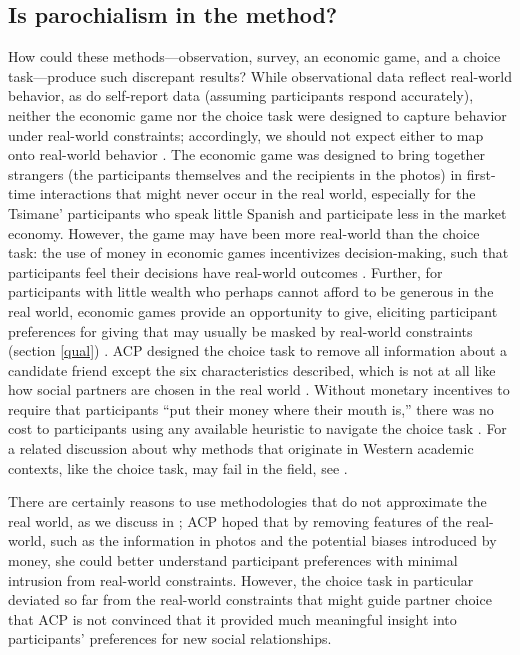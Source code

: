 \documentclass[bibauthoryear]{aa}
\begin{document}
	\subsection{Is parochialism in the method?}
How could these methods---observation, survey, an economic game, and a choice task---produce such discrepant results? While observational data reflect real-world behavior, as do self-report data (assuming participants respond accurately), neither the economic game nor the choice task were designed to capture behavior under real-world constraints; accordingly, we should not expect either to map onto real-world behavior  \citep{Pisor2020, gurven2008collective}. The economic game was designed to bring together strangers (the participants themselves and the recipients in the photos) in first-time interactions that might never occur in the real world, especially for the Tsimane' participants who speak little Spanish and participate less in the market economy. However, the game may have been more real-world than the choice task: the use of money in economic games incentivizes decision-making, such that participants feel their decisions have real-world outcomes \citep{guala2005methodology}. Further, for participants with little wealth who perhaps cannot afford to be generous in the real world, economic games provide an opportunity to give, eliciting participant preferences for giving that may usually be masked by real-world constraints (section \ref{qual}) \citep{Pisor2020}. ACP designed the choice task to remove all information about a candidate friend except the six characteristics described, which is not at all like how social partners are chosen in the real world \citep[see][for a relevant review]{barclay2013strategies}. Without monetary incentives to require that participants ``put their money where their mouth is,'' there was no cost to participants using any available  heuristic to navigate the choice task \citep{Pisor2020, xygalatasreligious}. For a related discussion about why methods that originate in Western academic contexts, like the choice task, may fail in the field, see \citet{hruschka2018learning}.

There are certainly reasons to use methodologies that do not approximate the real world, as we discuss in \citet{Pisor2020}; ACP hoped that by removing features of the real-world, such as the information in photos and the potential biases introduced by money, she could better understand participant preferences with minimal intrusion from real-world constraints. However, the choice task in particular deviated so far from the real-world constraints that might guide partner choice that ACP is not convinced that it provided much meaningful insight into participants' preferences for new social relationships.
\end{document}
